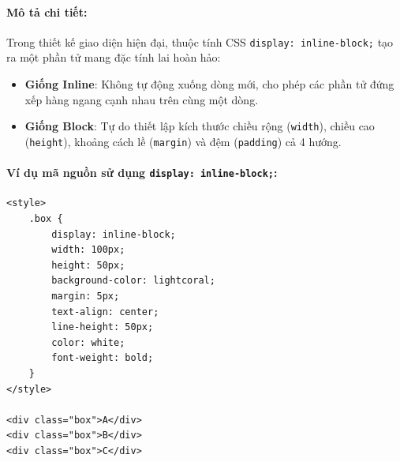 \documentclass[11pt,oneside]{book}
\newcommand{\codeinline}[1]{\textcolor{accentOrange}{\texttt{#1}}}
\begin{document}
\paragraph{Mô tả chi tiết:}
Trong thiết kế giao diện hiện đại, thuộc tính CSS \codeinline{display: inline-block;} tạo ra một phần tử mang đặc tính lai hoàn hảo:
\begin{itemize}[leftmargin=1.8em, itemsep=3pt, parsep=0pt]
    \item \textbf{Giống Inline}: Không tự động xuống dòng mới, cho phép các phần tử đứng xếp hàng ngang cạnh nhau trên cùng một dòng.
    \item \textbf{Giống Block}: Tự do thiết lập kích thước chiều rộng (\codeinline{width}), chiều cao (\codeinline{height}), khoảng cách lề (\codeinline{margin}) và đệm (\codeinline{padding}) cả 4 hướng.
\end{itemize}

\paragraph{Ví dụ mã nguồn sử dụng \codeinline{display: inline-block;}:}
\begin{codeWindow}
\begin{lstlisting}[language=HTML5]
<style>
    .box {
        display: inline-block;
        width: 100px;
        height: 50px;
        background-color: lightcoral;
        margin: 5px;
        text-align: center;
        line-height: 50px;
        color: white;
        font-weight: bold;
    }
</style>

<div class="box">A</div>
<div class="box">B</div>
<div class="box">C</div>
\end{lstlisting}
\end{codeWindow}

\begin{browserWindow}
\centering\sffamily
{} \quad
{} \quad
{}
\end{browserWindow}

\end{document}
